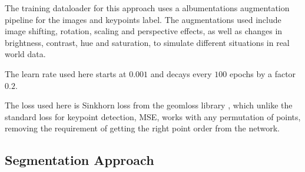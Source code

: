 \documentclass[10pt]{book}
\begin{document}
The training dataloader for this approach uses a albumentations augmentation pipeline for the images and keypoints label. The augmentations used include image shifting, rotation, scaling and perspective effects, as well as changes in brightness, contrast, hue and saturation, to simulate different situations in real world data.

The learn rate used here starts at $0.001$ and decays every $100$ epochs by a factor $0.2$. 


The loss used here is Sinkhorn loss from the geomloss library \cite{feydy2019interpolating}, which unlike the standard loss for keypoint detection, \ac{MSE}, works with any permutation of points, removing the requirement of getting the right point order from the network. 

\subsection{Segmentation Approach}
\end{document}
